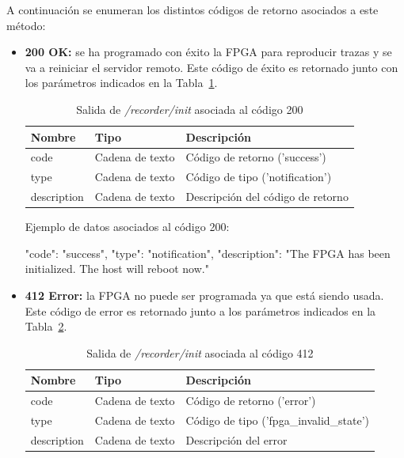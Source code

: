 A continuación se enumeran los distintos códigos de retorno asociados a este método:
\begin{itemize}

\item{\textbf{200 OK:} se ha programado con éxito la \gls{FPGA} para reproducir \glspl{traza} y se va a reiniciar el servidor remoto.
Este código de éxito es retornado junto con los parámetros indicados en la Tabla~\ref{extra:api:recorderinit:ok}.
\begin{table}[H]
\centering
\begin{tabular}{|l|l|l|}
\hline
\rowcolor[HTML]{F5F5F5}
\textbf{Nombre}  & \textbf{Tipo}   & \textbf{Descripción}              \\ \hline
code             & Cadena de texto & Código de retorno ('success')     \\ \hline
type             & Cadena de texto & Código de tipo ('notification')   \\ \hline
description      & Cadena de texto & Descripción del código de retorno \\ \hline
\end{tabular}
\caption{Salida de \textit{/recorder/init} asociada al código 200}
\label{extra:api:recorderinit:ok}
\end{table}
\begin{minipage}{\textwidth}
Ejemplo de datos asociados al código 200:

\begin{code}[language=json]
{
  "code": "success",
  "type": "notification",
  "description": "The FPGA has been initialized. The host will reboot now."
}
\end{code}
\end{minipage}
}

\item{\textbf{412 Error:} la \gls{FPGA} no puede ser programada ya que está siendo usada.
Este código de error es retornado junto a los parámetros indicados en la Tabla~\ref{extra:api:recorderinit:error}.
\begin{table}[H]
\centering
\begin{tabular}{|l|l|l|}
\hline
\rowcolor[HTML]{F5F5F5}
\textbf{Nombre}  & \textbf{Tipo}   & \textbf{Descripción}                    \\ \hline
code             & Cadena de texto & Código de retorno ('error')             \\ \hline
type             & Cadena de texto & Código de tipo ('fpga\_invalid\_state') \\ \hline
description      & Cadena de texto & Descripción del error                   \\ \hline
\end{tabular}
\caption{Salida de \textit{/recorder/init} asociada al código 412}
\label{extra:api:recorderinit:error}
\end{table}

}
\end{itemize}
